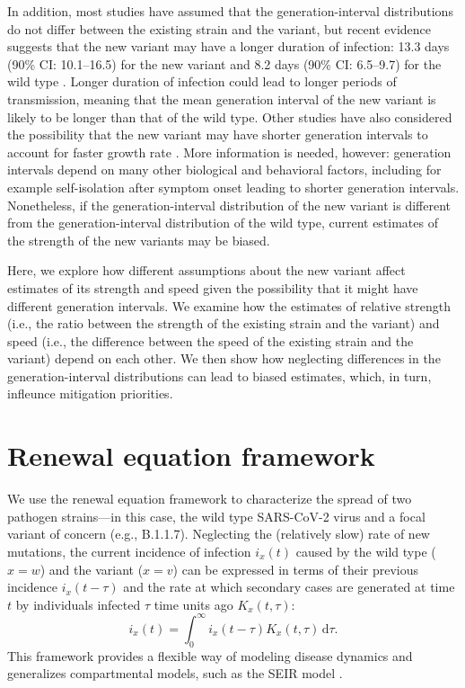 \documentclass[12pt]{article}
\newcommand{\dd}[1]{\ensuremath{\, \mathrm{d}#1}}
\newcommand{\dtau}{\dd{\tau}}
\begin{document}
In addition, most studies have assumed that the generation-interval distributions do not differ between the existing strain and the variant, but recent evidence suggests that the new variant may have a longer duration of infection: 13.3 days (90\% CI: 10.1--16.5) for the new variant and 8.2 days (90\% CI: 6.5--9.7) for the wild type \citep{kissler2021densely}.
Longer duration of infection could lead to longer periods of transmission, meaning that the mean generation interval of the new variant is likely to be longer than that of the wild type.
Other studies have also considered the possibility that the new variant may have shorter generation intervals to account for faster growth rate \citep{davies2021estimated}.
More information is needed, however: generation intervals depend on many other biological and behavioral factors, including for example self-isolation after symptom onset leading to shorter generation intervals.
Nonetheless, if the generation-interval distribution of the new variant is different from the generation-interval distribution of the wild type, current estimates of the strength of the new variants may be biased.

Here, we explore how different assumptions about the new variant affect estimates of its strength and speed given the possibility that it might have different generation intervals.
We examine how the estimates of relative strength (i.e., the ratio between the strength of the existing strain and the variant) and speed (i.e., the difference between the speed of the existing strain and the variant) depend on each other.
We then show how neglecting differences in the generation-interval distributions can lead to biased estimates, which, in turn, infleunce mitigation priorities.

\section{Renewal equation framework}

We use the renewal equation framework to characterize the spread of two pathogen strains---in this case, the wild type SARS-CoV-2 virus and a focal variant of concern (e.g., B.1.1.7).
Neglecting the (relatively slow) rate of new mutations, the current incidence of infection $i_x(t)$ caused by the wild type ($x=w$) and the variant ($x=v$) can be expressed in terms of their previous incidence $i_x(t-\tau)$ and the rate at which secondary cases are generated at time $t$ by individuals infected $\tau$ time units ago $K_x(t, \tau)$:
\begin{equation}
i_x(t) = \int_0^\infty i_x(t-\tau) K_x(t, \tau) \dtau.
\end{equation}
This framework provides a flexible way of modeling disease dynamics and generalizes compartmental models, such as the SEIR model \citep{heesterbeek1996concept, diekmann2000mathematical, roberts2004modelling, aldis2005integral, roberts2007model, champredon2018equivalence}.
\end{document}
